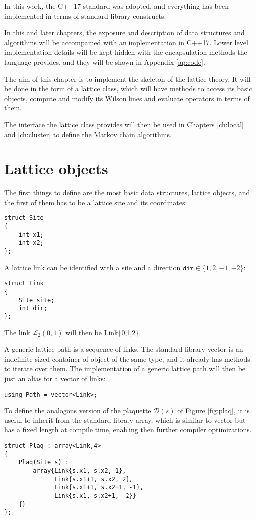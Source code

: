 In this work, the C++17 standard was adopted,
and everything has been implemented in terms of standard library constructs.

In this and later chapters, the exposure and description of data structures and algorithms will be accompained with an implementation in C++17.
Lower level implementation details will be kept hidden with the encapsulation methods the language provides,
and they will be shown in Appendix \ref{ap:code}.

The aim of this chapter is to implement the skeleton of the lattice theory.
It will be done in the form of a lattice class, which will have methods to access its basic objects,
compute and modify its Wilson lines and evaluate operators in terms of them.

The interface the lattice class provides will then be used in Chapters \ref{ch:local} and \ref{ch:cluster} to define the Markov chain algorithms.

\section{Lattice objects}

The first things to define are the most basic data structures, \ie lattice objects,
and the first of them has to be a lattice site and its coordinates:
\begin{lstlisting}[caption={Site type}]
struct Site
{
    int x1;
    int x2;
};
\end{lstlisting}
A lattice link can be identified with a site and a direction $\texttt{dir} \in \{1,2,-1,-2\}$:
\begin{lstlisting}[caption={Link type}]
struct Link
{
    Site site;
    int dir;
};
\end{lstlisting}
The link $\mathcal L_2(0,1)$ will then be {\ttfamily Link\{0,1,2\}}.

A generic lattice path is a sequence of links.
The standard library {\ttfamily vector} is an indefinite sized container of object of the same type,
and it already has methods to iterate over them.
The implementation of a generic lattice path will then be just an alias for a vector of links:
\begin{lstlisting}[caption={Path type}]
using Path = vector<Link>;
\end{lstlisting}

To define the analogous version of the plaquette $\mathcal D(s)$ of Figure \ref{fig:plaq},
it is useful to inherit from the standard library {\ttfamily array},
which is similar to {\ttfamily vector} but has a fixed length at compile time,
enabling then further compiler optimizations.
\begin{lstlisting}[caption={Plaquette type}]
struct Plaq : array<Link,4>
{
    Plaq(Site s) :
        array{Link{s.x1, s.x2, 1},
              Link{s.x1+1, s.x2, 2},
              Link{s.x1+1, s.x2+1, -1},
              Link{s.x1, s.x2+1, -2}}
    {}
};
\end{lstlisting}

